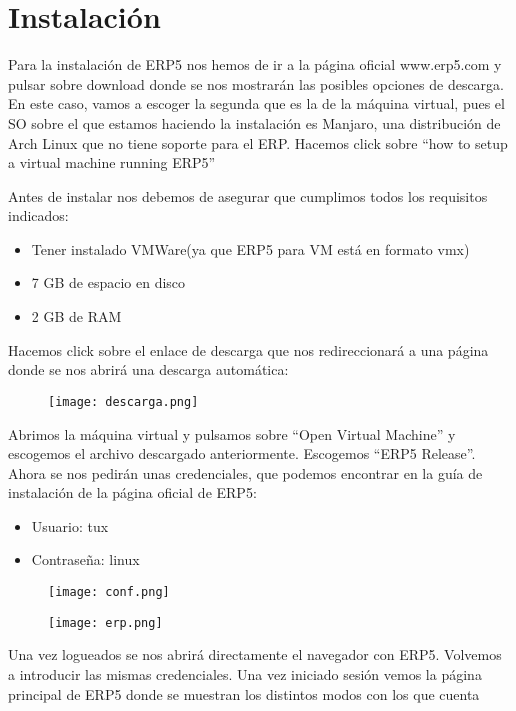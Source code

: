 \chapter{Instalación}
Para la instalación de ERP5 nos hemos de ir a la página oficial www.erp5.com y pulsar sobre download donde se nos mostrarán las posibles opciones de descarga. En este caso, vamos a escoger la segunda que es la de la máquina virtual, pues el SO sobre el que estamos haciendo la instalación es Manjaro, una distribución de Arch Linux que no tiene soporte para el ERP. 
Hacemos click sobre “how to setup a virtual machine running ERP5”

Antes de instalar nos debemos de asegurar que cumplimos todos los requisitos indicados:
\begin{itemize}
	\item Tener instalado VMWare(ya que ERP5 para VM está en formato vmx)
	\item 7 GB de espacio en disco
	\item 2 GB de RAM
\end{itemize}

Hacemos click sobre el enlace de descarga que nos redireccionará a una página donde se nos abrirá una descarga automática:

\begin{figure}[!h]
  \centering
    \texttt{[image: descarga.png]}
\end{figure}

Abrimos la máquina virtual y pulsamos sobre “Open Virtual Machine” y escogemos el archivo descargado anteriormente. Escogemos “ERP5 Release”. Ahora se nos pedirán unas credenciales, que podemos encontrar en la guía de instalación de la página oficial de ERP5:
\begin{itemize}
	\item Usuario: tux
	\item Contraseña: linux
\end{itemize}

\begin{figure}[!h]
  \centering
    \texttt{[image: conf.png]}
\end{figure}

\begin{figure}[!h]
  \centering
    \texttt{[image: erp.png]}
\end{figure}

Una vez logueados se nos abrirá directamente el navegador con ERP5. Volvemos a introducir las mismas credenciales. Una vez iniciado sesión vemos la página principal de ERP5 donde se muestran los distintos modos con los que cuenta

